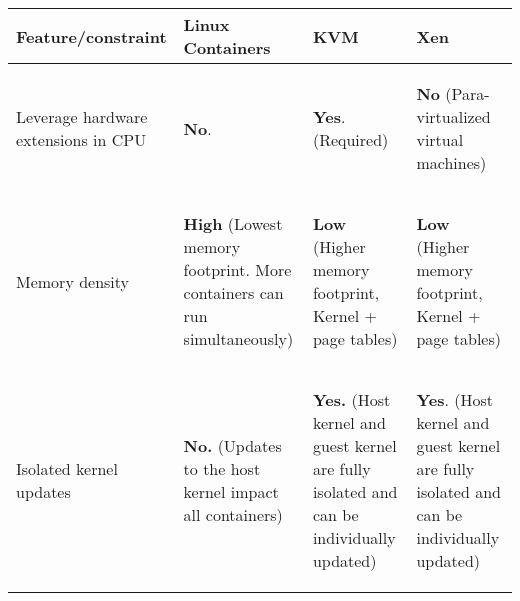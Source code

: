 \begin{table}[H]
\begin{center}
\renewcommand{\arraystretch}{1.25}
\begin{tabular}{ | p{3.25cm} | p{3.25cm} | p{3.25cm} | p{3.25cm} |}
  \hline                        
  \textbf{Feature/constraint} & \textbf{Linux Containers} & \textbf{KVM} & \textbf{Xen}\\ \hline
  
     \begin{flushleft}
     Leverage hardware extensions in CPU
     \end{flushleft} & \begin{flushleft}
     \textbf{No}.
     \end{flushleft} & \begin{flushleft}
     \textbf{Yes}. (Required) \end{flushleft} & \begin{flushleft}\textbf{No} (Para-virtualized virtual machines)
     \end{flushleft} \\ \hline
     \begin{flushleft}
      Memory density
      \end{flushleft} & \begin{flushleft}
      \textbf{High} (Lowest memory footprint. More containers can run simultaneously)
      \end{flushleft} & \begin{flushleft}
      \textbf{Low} (Higher memory footprint, Kernel + page tables)
      \end{flushleft} & \begin{flushleft}
      \textbf{Low} (Higher memory footprint, Kernel + page tables)
      \end{flushleft} \\ \hline
      \begin{flushleft}
      Isolated kernel updates
      \end{flushleft} & \begin{flushleft}
      \textbf{No.} (Updates to the host kernel impact all containers)
      \end{flushleft} & \begin{flushleft}
      \textbf{Yes.} (Host kernel and guest kernel are fully isolated and can be individually updated)
      \end{flushleft} & \begin{flushleft}
      \textbf{Yes}. (Host kernel and guest kernel are fully isolated and can be individually updated)

\end{flushleft}
\end{tabular}
\end{center}
\end{table}
